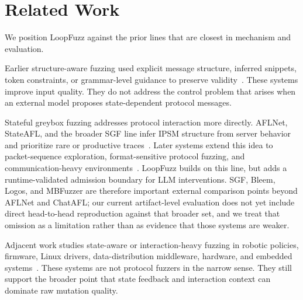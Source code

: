 \documentclass[conference]{IEEEtran}
\begin{document}
\section{Related Work}
We position LoopFuzz against the prior lines that are closest in mechanism and evaluation.

Earlier structure-aware fuzzing used explicit message structure, inferred snippets, token constraints, or grammar-level guidance to preserve validity~\cite{snipuzz_black_box_fuzzing_2021,token_level_fuzzing_2021,gramatron_effective_grammar_aware_2021,griffin_grammar_free_dbms_2022,no_grammar_no_problem_2023,likely_invariants_feedback_2021,mundofuzz_grammar_inference_2022}. These systems improve input quality. They do not address the control problem that arises when an external model proposes state-dependent protocol messages.

Stateful greybox fuzzing addresses protocol interaction more directly. AFLNet, StateAFL, and the broader SGF line infer IPSM structure from server behavior and prioritize rare or productive traces~\cite{aflnet,stateafl,sgf_usenix22,profuzzbench_benchmark_stateful_protocol_2021}. Later systems extend this idea to packet-sequence exploration, format-sensitive protocol fuzzing, and communication-heavy environments~\cite{bleem_packet_sequence_2023,formatted_stateful_greybox_fuzzing_2024,logos_log_guided_fuzzing_2024,msgfuzzer_message_sequence_guided_2024,resolverfuzz_query_response_2024,mbfuzzer_mqtt_2025,fuzzusb_hybrid_stateful_fuzzing_2022,dtls_fuzzer_dtls_protocol_2022,edhoc_fuzzer_edhoc_protocol_2023,tron_fuzzing_linux_network_2025}. LoopFuzz builds on this line, but adds a runtime-validated admission boundary for LLM interventions. SGF, Bleem, Logos, and MBFuzzer are therefore important external comparison points beyond AFLNet and ChatAFL; our current artifact-level evaluation does not yet include direct head-to-head reproduction against that broader set, and we treat that omission as a limitation rather than as evidence that those systems are weaker.

Adjacent work studies state-aware or interaction-heavy fuzzing in robotic policies, firmware, Linux drivers, data-distribution middleware, hardware, and embedded systems~\cite{pgfuzz_policy_guided_fuzzing_2021,android_smarttvs_vulnerability_discovery_2021,fuzzware_mmio_2022,statefuzz_linux_driver_2022,differential_fuzzing_data_distribution_2024,fuzzing_hardware_like_software_2022,coverage_guided_fuzzing_embedded_2023}. These systems are not protocol fuzzers in the narrow sense. They still support the broader point that state feedback and interaction context can dominate raw mutation quality.
\end{document}
